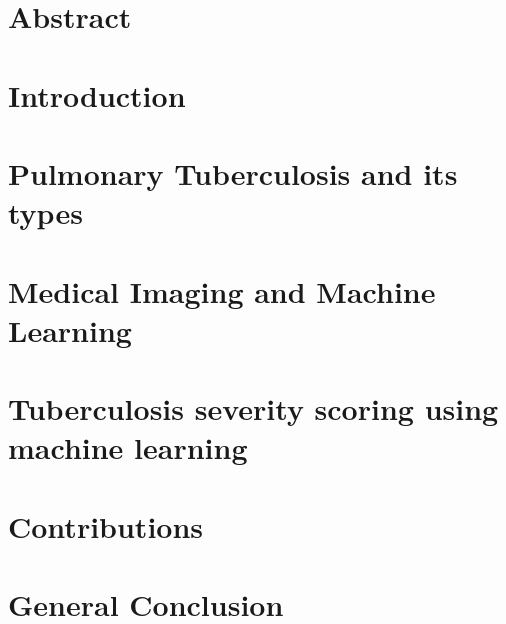 \documentclass[12pt]{report}
\begin{document}
\chapter*{Abstract}


\tableofcontents
\newpage    
\printacronyms[include-classes=abbrev,name=Abbreviations]
\chapter*{Introduction}

\chapter{Pulmonary Tuberculosis and its types}

\chapter{Medical Imaging and Machine Learning}

\chapter{Tuberculosis severity scoring using machine learning}

\chapter{Contributions}

\chapter*{General Conclusion}


\newpage
\printacronyms[include-classes=abbrev,name=Abbreviations]
\listoffigures
\listoftables
\newpage
 

\end{document}
